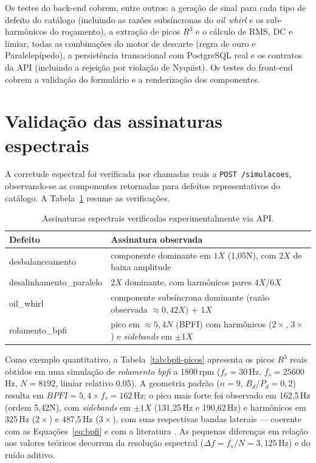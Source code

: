Os testes do back-end cobrem, entre outros: a geração de sinal para cada tipo
de defeito do catálogo (incluindo as razões subsíncronas do \emph{oil whirl} e
os sub-harmônicos do roçamento), a extração de picos \(R^3\) e o cálculo de RMS,
DC e limiar, todas as combinações do motor de descarte (regra de ouro e
Paralelepípedo), a persistência transacional com PostgreSQL real e os contratos
da API (incluindo a rejeição por violação de Nyquist). Os testes do front-end
cobrem a validação do formulário e a renderização dos componentes.

\section{Validação das assinaturas espectrais}

A corretude espectral foi verificada por chamadas reais a \texttt{POST /simulacoes},
observando-se as componentes retornadas para defeitos representativos do
catálogo. A Tabela~\ref{tab:assinaturas} resume as verificações.

\begin{table}[htbp]
\centering
\caption{Assinaturas espectrais verificadas experimentalmente via API.}
\label{tab:assinaturas}
\begin{tabular}{@{}p{4.2cm}p{8.8cm}@{}}
\toprule
\textbf{Defeito} & \textbf{Assinatura observada} \\
\midrule
desbalanceamento & componente dominante em \(1X\) (1,05N), com \(2X\) de baixa amplitude \\
desalinhamento\_paralelo & \(2X\) dominante, com harmônicos pares \(4X\)/\(6X\) \\
oil\_whirl & componente subsíncrona dominante (razão observada \(\approx 0{,}42X\)) + \(1X\) \\
rolamento\_bpfi & pico em \(\approx 5{,}4N\) (BPFI) com harmônicos (\(2\times\), \(3\times\)) e \emph{sidebands} em \(\pm 1X\) \\
\bottomrule
\end{tabular}
\par\vspace{2pt}{\footnotesize Fonte: observações registradas nas sessões de validação (STATUS.md/HANDOFF.md) e repetidas nesta execução.}
\end{table}

Como exemplo quantitativo, a Tabela~\ref{tab:bpfi-picos} apresenta os picos
\(R^3\) reais obtidos em uma simulação de \emph{rolamento bpfi} a 1800\,rpm
(\(f_r = 30\)\,Hz, \(f_s = 25600\)\,Hz, \(N = 8192\), limiar relativo 0,05). A
geometria padrão (\(n=9\), \(B_d/P_d = 0{,}2\)) resulta em
\(BPFI = 5{,}4 \times f_r = 162\)\,Hz; o pico mais forte foi observado em
162,5\,Hz (ordem 5,42N), com \emph{sidebands} em \(\pm 1X\) (131,25\,Hz e
190,62\,Hz) e harmônicos em 325\,Hz (\(2\times\)) e 487,5\,Hz (\(3\times\)),
com suas respectivas bandas laterais --- coerente com as
Equações~\eqref{eq:bpfi} e com a literatura \cite{randall2011}. As pequenas
diferenças em relação aos valores teóricos decorrem da resolução espectral
(\(\Delta f = f_s/N = 3{,}125\)\,Hz) e do ruído aditivo.

